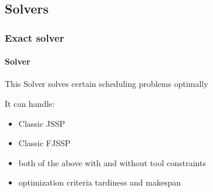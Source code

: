 \documentclass[letterpaper,10pt,english]{sphinxmanual}
\begin{document}
\begin{fulllineitems}

\begin{fulllineitems}
\label{\detokenize{data_generator:data_generator.task.Task.str_info}}
\end{fulllineitems}


\end{fulllineitems}



\subsection{Solvers}
\label{\detokenize{solvers:solvers}}\label{\detokenize{solvers::doc}}

\subsubsection{Exact solver}
\label{\detokenize{agents.solver:exact-solver}}\label{\detokenize{agents.solver::doc}}

\paragraph{Solver}
\label{\detokenize{agents.solver:module-agents.solver.solver}}\label{\detokenize{agents.solver:solver}}
\sphinxAtStartPar
This Solver solves certain scheduling problems optimally

\sphinxAtStartPar
It can handle:
\begin{itemize}
\item {} 
\sphinxAtStartPar
Classic JSSP

\item {} 
\sphinxAtStartPar
Classic FJSSP

\item {} 
\sphinxAtStartPar
both of the above with and without tool constraints

\item {} 
\sphinxAtStartPar
optimization criteria tardiness and makespan

\end{itemize}
\end{document}
